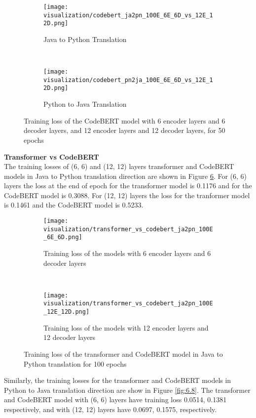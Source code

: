 \begin{figure}[H]
\centering
  \begin{subfigure}[h]{0.45\textwidth}
    \texttt{[image: visualization/codebert\_ja2pn\_100E\_6E\_6D\_vs\_12E\_12D.png]}
    \caption{Java to Python Translation}
    \label{fig:6.6_a}
  \end{subfigure}
  ~
  \begin{subfigure}[h]{0.45\textwidth}
    \texttt{[image: visualization/codebert\_pn2ja\_100E\_6E\_6D\_vs\_12E\_12D.png]}
    \caption{Python to Java Translation}
    \label{fig:6.6_b}
  \end{subfigure}
\caption[Training loss of the CodeBERT model with 6 encoder layers and 6 decoder layers, and 12 encoder layers and 12 decoder layers, for 50 epochs]{Training loss of the CodeBERT model with 6 encoder layers and 6 decoder layers, and 12 encoder layers and 12 decoder layers, for 50 epochs}
\label{fig:6.6}
\end{figure}
\medskip
\smallskip
\textbf{Transformer vs CodeBERT}\\
The training losses of (6, 6) and (12, 12) layers transformer and CodeBERT models in Java to Python translation direction are shown in Figure \ref{fig:6.7}. For (6, 6) layers the loss at the end of epoch for the transformer model is 0.1176 and for the CodeBERT model is 0.3088. For (12, 12) layers the loss for the tranformer model is 0.1461 and the CodeBERT model is 0.5233.
\begin{figure}[H]
\centering
  \begin{subfigure}[h]{0.45\textwidth}
    \texttt{[image: visualization/transformer\_vs\_codebert\_ja2pn\_100E\_6E\_6D.png]}
    \caption{Training loss of the models with 6 encoder layers and 6 decoder layers}
    \label{fig:6.7_a}
  \end{subfigure}
  ~
  \begin{subfigure}[h]{0.45\textwidth}
    \texttt{[image: visualization/transformer\_vs\_codebert\_ja2pn\_100E\_12E\_12D.png]}
    \caption{Training loss of the models with 12 encoder layers and 12 decoder layers}
    \label{fig:6.7_b}
  \end{subfigure}
\caption[Training loss of the transformer and CodeBERT model in Java to Python translation for 100 epochs]{Training loss of the transformer and CodeBERT model in Java to Python translation for 100 epochs}
\label{fig:6.7}
\end{figure}
Similarly, the training losses for the transformer and CodeBERT models in Python to Java translation direction are show in Figure \ref{fig:6.8}. The transformer and CodeBERT model with (6, 6) layers have training loss 0.0514, 0.1381 respectively, and with (12, 12) layers have 0.0697, 0.1575, respectively.
